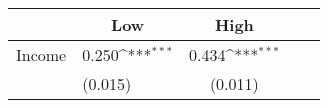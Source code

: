 {
\def\sym#1{\ifmmode^{#1}\else\(^{#1}\)\fi}
\begin{tabular*}{.4\hsize}{@{\hskip\tabcolsep\extracolsep\fill}l*{2}{lc}}
\toprule
                &\multicolumn{1}{c}{Low}&\multicolumn{1}{c}{High}\\
\midrule
Income          &    0.250\sym{***}&    0.434\sym{***}\\
                &  (0.015)         &  (0.011)         \\
\bottomrule
\end{tabular*}
}
